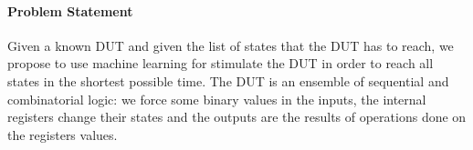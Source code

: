 \documentclass{article}
\begin{document}
\paragraph{Problem Statement}
Given a known DUT and given the list of states that the DUT has to reach, we propose to use machine learning for stimulate the DUT in order to reach all states in the shortest possible time.
The DUT is an ensemble of sequential and combinatorial logic: we force some binary values in the inputs, the internal registers change their states and the outputs are the results of operations done on the registers values.
\end{document}
